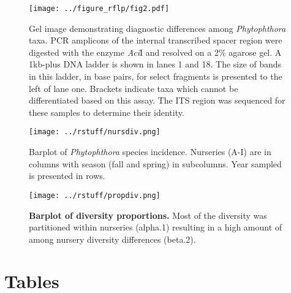 \documentclass[12pt]{article}
\begin{document}
\begin{figure}[!ht]
\begin{center}
\texttt{[image: ../figure\_rflp/fig2.pdf]}
\end{center}
\caption{
Gel image demonstrating diagnostic differences among \emph{Phytophthora} taxa. PCR amplicons of the internal transcribed spacer region were digested with the enzyme \emph{Aci}I and resolved on a 2\% agarose gel.  A 1kb-plus DNA ladder is shown in lanes 1 and 18.  The size of bands in this ladder, in base pairs, for select fragments is presented to the left of lane one.  Brackets indicate taxa which cannot be differentiated based on this assay.  The ITS region was sequenced for these samples to determine their identity.
}
\label{fig:gel}
\end{figure}
\clearpage




\begin{figure}[!ht]
\begin{center}
\texttt{[image: ../rstuff/nursdiv.png]}
\end{center}
\caption{
Barplot of \emph{Phytophthora} species incidence.  Nurseries (A-I) are in columns with season (fall and spring) in subcolumns.  Year sampled is presented in rows.
}
\label{fig:nursdiv}
\end{figure}
\clearpage

\begin{figure}[!ht]
\begin{center}
\texttt{[image: ../rstuff/propdiv.png]}
\end{center}
\caption{
{\bf Barplot of diversity proportions.} Most of the diversity was partitioned within nurseries (alpha.1) resulting in a high amount of among nursery diversity differences (beta.2).
}
\label{fig:propdiv}
\end{figure}
\clearpage

\section*{Tables}
\end{document}
